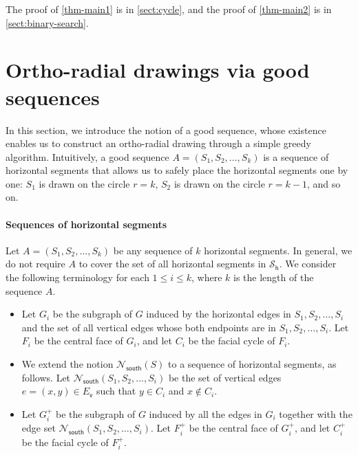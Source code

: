 \documentclass{theoretics}
\makeatletter
\newcommand{\RR}{\mathcal{R}}
\newcommand{\EV}{E_\mathsf{v}}
\newcommand{\PH}{\mathcal{S}_\mathsf{h}}
\newcommand{\Nsouth}{\mathcal{N}_\mathsf{south}}
\newcommand\IfRestateTF{%
  \ifx\label\thmt@gobble@label %
    \expandafter\@firstoftwo
  \else
    \expandafter\@secondoftwo
  \fi
}
\newcommand{\RestateRemark}{\IfRestateTF{{\normalfont\bfseries (Restated) }}{}}
\makeatother
\begin{document}




The proof of \cref{thm-main1} is in \cref{sect:cycle}, and the proof of \cref{thm-main2} is in \cref{sect:binary-search}. 

\section{Ortho-radial drawings via good sequences}\label{sect:drawing}

In this section, we introduce the notion of a good sequence, whose existence enables us to construct an ortho-radial drawing through a simple greedy algorithm. Intuitively, a good sequence $A = (S_1, S_2, \ldots, S_{k})$ is a sequence of horizontal segments that allows us to safely place the horizontal segments one by one: $S_1$ is drawn on the circle $r=k$, $S_2$ is drawn on the circle $r = k-1$, and so on.  


\paragraph{Sequences of horizontal segments} Let $A = (S_1, S_2, \ldots, S_{k})$ be any sequence of $k$ horizontal segments. In general, we do not require $A$ to cover the set of all horizontal segments in $\PH$. We consider the following terminology for each $1 \leq i \leq k$, where $k$ is the length of the sequence $A$.
\begin{itemize}
    \item Let $G_i$ be the subgraph of $G$ induced by the horizontal edges in $S_1, S_2, \ldots, S_{i}$ and the set of all vertical edges whose both endpoints are in $S_1, S_2, \ldots, S_{i}$.
 Let $F_i$ be the central face of $G_i$, and let $C_i$ be the facial cycle of $F_i$.
    \item We extend the notion $\Nsouth(S)$ to a sequence of horizontal segments, as follows. Let $\Nsouth(S_1, S_2, \ldots, S_{i})$ be the set of vertical edges $e = (x,y) \in \EV$ such that $y \in C_i$ and $x \notin C_i$. 
    \item Let $G_i^+$ be the subgraph of $G$ induced by all the edges in $G_i$ together with the edge set $\Nsouth(S_1, S_2, \ldots, S_{i})$. Let $F_i^+$ be the central face of $G_i^+$, and let $C_i^+$ be the facial cycle of $F_i^+$.
\end{itemize}
\end{document}
